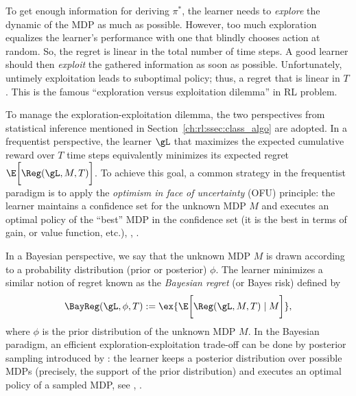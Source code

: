 To get enough information for deriving $\pi^*$, the learner needs to \emph{explore} the dynamic of the MDP as much as possible.
However, too much exploration equalizes the learner's performance with one that blindly chooses action at random.
So, the regret is linear in the total number of time steps.
A good learner should then \emph{exploit} the gathered information as soon as possible.
Unfortunately, untimely exploitation leads to suboptimal policy; thus, a regret that is linear in $T$. This is the famous “exploration versus exploitation dilemma” in RL problem.

To manage the exploration-exploitation dilemma, the two perspectives from statistical inference mentioned in Section~\ref{ch:rl:ssec:class_algo} are adopted. %
In a frequentist perspective, the learner $\gL$ that maximizes the expected cumulative reward over $T$ time steps equivalently minimizes its expected regret $\E\bigg[\Reg(\gL, M, T)\bigg]$.
To achieve this goal, a common strategy in the frequentist paradigm is to apply the \emph{optimism in face of uncertainty} (OFU) principle: the learner maintains a confidence set for the unknown MDP $M$ and executes an optimal policy of the
“best” MDP in the confidence set (it is the best in terms of gain, or value function, etc.), \eg, \cite{jaksch2010near, filippi2010optimism, bartlett2012regal, azar2017minimax, fruit2017regret, jin2018q, fruit2018efficient, fruit2018near, zanette2019tighter, zhang2019regret, bourel2020tightening, ortner2020regret}.

In a Bayesian perspective, we say that the unknown MDP $M$ is drawn according to a probability distribution (prior or posterior) $\phi$. %
The learner minimizes a similar notion of regret known as the \emph{Bayesian regret} (or Bayes risk) defined by
\begin{equation}
    \label{eq:bayes_rg}
    \BayReg(\gL, \phi, T):=\ex{\E\bigg[\Reg(\gL, M, T) \mid M\bigg]},
\end{equation}
where $\phi$ is the prior distribution of the unknown MDP $M$.
In the Bayesian paradigm, an efficient exploration-exploitation trade-off can be done by posterior sampling introduced by \cite{thompson1933likelihood}: the learner keeps a posterior distribution over possible MDPs (precisely, the support of the prior distribution) and executes an optimal policy of a sampled MDP, see \eg, \cite{osband2013more, gopalan2015thompson, ouyang2017learning}.

